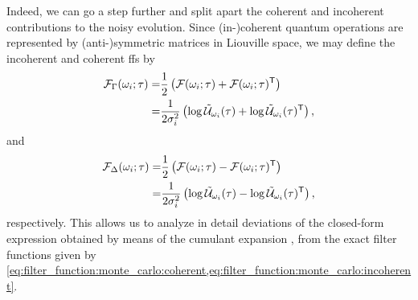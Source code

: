 Indeed, we can go a step further and split apart the coherent and incoherent contributions to the noisy evolution.
Since (in-)coherent quantum operations are represented by (anti-)symmetric matrices in Liouville space, we may define the incoherent and coherent \glspl{ff} by
\begin{equation}
    \label{eq:filter_function:monte_carlo:incoherent}
    \begin{split}
        \mathcal{F}_\Gamma(\omega_i;\tau) =& \frac{1}{2}\left(\mathcal{F}(\omega_i;\tau) + \mathcal{F}(\omega_i;\tau)^\mathsf{T}\right) \\
                                     =& \frac{1}{2\sigma_i^2}\left(\log\mathcal{\tilde{U}}_{\omega_i}(\tau) + \log\mathcal{\tilde{U}}_{\omega_i}(\tau)^\mathsf{T}\right),
    \end{split}
\end{equation}
and
\begin{equation}
    \label{eq:filter_function:monte_carlo:coherent}
    \begin{split}
        \mathcal{F}_\Delta(\omega_i;\tau) =& \frac{1}{2}\left(\mathcal{F}(\omega_i;\tau) - \mathcal{F}(\omega_i;\tau)^\mathsf{T}\right) \\
                                     =& \frac{1}{2\sigma_i^2}\left(\log\mathcal{\tilde{U}}_{\omega_i}(\tau) - \log\mathcal{\tilde{U}}_{\omega_i}(\tau)^\mathsf{T}\right),
    \end{split}
\end{equation}
respectively.
This allows us to analyze in detail deviations of the closed-form expression obtained by means of the cumulant expansion , from the exact filter functions given by \cref{eq:filter_function:monte_carlo:coherent,eq:filter_function:monte_carlo:incoherent}.

